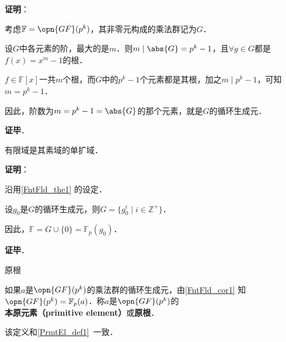 \textbf{证明}：

考虑$\mathbb{F}=\opn{GF}(p^k)$，其非零元构成的乘法群记为$G$．

设$G$中各元素的阶，最大的是$m$．则$m\mid \abs{G} = p^k-1$，且$\forall g\in G$都是$f(x)=x^m-1$的根．

$f\in\mathbb{F}[x]$一共$m$个根，而$G$中的$p^k-1$个元素都是其根，加之$m\mid p^k-1$，可知$m=p^k-1$．

因此，阶数为$m=p^k-1=\abs{G}$的那个元素，就是$G$的循环生成元．

\textbf{证毕}．



\begin{corollary}{}\label{FntFld_cor1}
有限域是其素域的单扩域．
\end{corollary}

\textbf{证明}：

沿用\autoref{FntFld_the1} 的设定．

设$g_0$是$G$的循环生成元，则$G=\{g_0^i\mid i\in\mathbb{Z}^+\}$．

因此，$\mathbb{F}=G\cup\{0\}=\mathbb{F}_p(g_0)$．

\textbf{证毕}．

\begin{definition}{原根}

如果$a$是$\opn{GF}(p^k)$的乘法群的循环生成元，由\autoref{FntFld_cor1} 知$\opn{GF}(p^k)=\mathbb{F}_p(a)$．称$a$是$\opn{GF}(p^k)$的\textbf{本原元素（primitive element）}或\textbf{原根}．

该定义和\autoref{PrmtEl_def1}~一致．

\end{definition}

